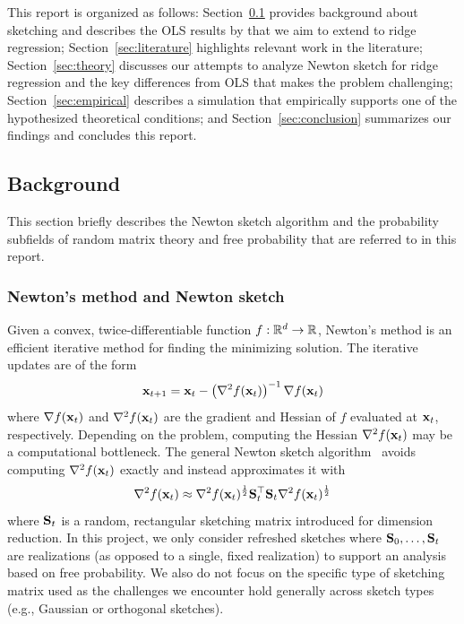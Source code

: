 This report is organized as follows: Section~\ref{sec:background} provides background about sketching and describes the OLS results by \citet{Lacotte:2020} that we aim to extend to ridge regression; Section~\ref{sec:literature} highlights relevant work in the literature; Section~\ref{sec:theory} discusses our attempts to analyze Newton sketch for ridge regression and the key differences from OLS that makes the problem challenging; Section~\ref{sec:empirical} describes a simulation that empirically supports one of the hypothesized theoretical conditions; and Section~\ref{sec:conclusion} summarizes our findings and concludes this report.

\subsection{Background} \label{sec:background}

This section briefly describes the Newton sketch algorithm and the probability subfields of random matrix theory and free probability that are referred to in this report.

\subsubsection{Newton's method and Newton sketch} \label{sec:newton}

Given a convex, twice-differentiable function $f:\mathbb{R}^d\rightarrow\mathbb{R}$, Newton's method is an efficient iterative method for finding the minimizing solution. The iterative updates are of the form
\[
\mathbf{x}_{t+1} = \mathbf{x}_t - \left(\nabla^2f(\mathbf{x}_t)\right)^{-1}\nabla f(\mathbf{x}_t)
\]
where $\nabla f(\mathbf{x}_t)$ and $\nabla^2f(\mathbf{x}_t)$ are the gradient and Hessian of $f$ evaluated at $\mathbf{x}_t$, respectively. Depending on the problem, computing the Hessian $\nabla^2f(\mathbf{x}_t)$ may be a computational bottleneck. The general Newton sketch algorithm~\citep{Pilanci:2017} avoids computing $\nabla^2f(\mathbf{x}_t)$ exactly and instead approximates it with
\[
\nabla^2f(\mathbf{x}_t) \approx \nabla^2f(\mathbf{x}_t)^\frac{1}{2}\mathbf{S}_t^\top\mathbf{S}_t\nabla^2f(\mathbf{x}_t)^\frac{1}{2}
\]
where $\mathbf{S}_t$ is a random, rectangular sketching matrix introduced for dimension reduction. In this project, we only consider refreshed sketches where $\mathbf{S}_0,\ldots,\mathbf{S}_t$ are \iid realizations (as opposed to a single, fixed realization) to support an analysis based on free probability. We also do not focus on the specific type of sketching matrix used as the challenges we encounter hold generally across sketch types (e.g., \iid Gaussian or orthogonal sketches).
\\

